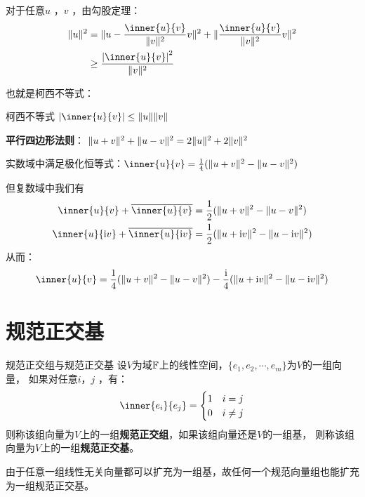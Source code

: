 对于任意\(u\) ，\(v\) ，由勾股定理：
\begin{align*}
    \norm{u}^{2} &= \norm{u - \frac{\inner{u}{v}}{\norm{v}^{2}} v}^{2} +
    \norm{\frac{\inner{u}{v}}{\norm{v}^{2}} v}^{2} \\
    &\geq \frac{\abs{\inner{u}{v}}^{2}}{\norm{v}^{2}}
\end{align*}

也就是柯西不等式：
\begin{theorem}{柯西不等式}
    \(\abs{\inner{u}{v}} \leq \norm{u} \norm{v}\)
\end{theorem}

\begin{corollary}{}
    \textbf{平行四边形法则}： \(\lVert u + v\rVert^{2} + \lVert u - v\rVert^{2} = 2\lVert u\rVert^{2} +
    2\lVert v\rVert^{2}\)

    实数域中满足极化恒等式：\(\inner{u}{v} = \frac{1}{4}(\norm{u+v}^{2} -
    \norm{u-v}^{2})\)

    但复数域中我们有
    \begin{align*}
        \inner{u}{v} + \conj{\inner{u}{v}} &= \frac{1}{2}(\norm{u+v}^{2} -
        \norm{u-v}^{2}) \\
        \inner{u}{\i v} + \conj{\inner{u}{\i v}} &=
        \frac{1}{2}(\norm{u+\i v}^{2} -
        \norm{u-\i v}^{2})
    \end{align*}
    从而：
    \[
        \inner{u}{v} = \frac{1}{4}(\norm{u+v}^{2} - \norm{u-v}^{2}) -
        \frac{\i}{4}(\norm{u+\i v}^{2} - \norm{u-\i v}^{2})
    \]
\end{corollary}

\section{规范正交基}

\begin{definition}{规范正交组与规范正交基}
    设\(V\)为域\(\mathbb{F}\)上的线性空间，\(\{e_1, e_2, \cdots, e_m\}\)为\(V\)的一组向量，
    如果对任意\(i\)，\(j\) ，有：
    \[
        \inner{e_i}{e_j} =
        \begin{cases}
            1 & i = j \\
            0 & i \neq j
        \end{cases}
    \]
    则称该组向量为\(V\)上的一组\textbf{规范正交组}，如果该组向量还是\(V\)的一组基，
    则称该组向量为\(V\)上的一组\textbf{规范正交基}。
\end{definition}

由于任意一组线性无关向量都可以扩充为一组基，故任何一个规范向量组也能扩充为一组规范正交基。

